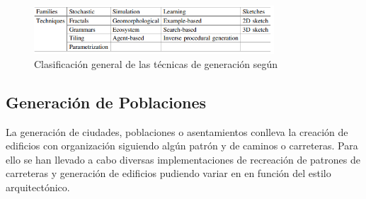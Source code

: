             \begin{figure}[h]
                \centering
                \includegraphics[width=0.8\textwidth]{img/terrain-generation-techniques.png}
                \caption{Clasificación general de las técnicas de generación según \cite{Valencia-Rosado2019}}
            \end{figure}
        




    \subsection{Generación de Poblaciones}

        La generación de ciudades, poblaciones o asentamientos conlleva la creación de edificios con organización siguiendo algún patrón y de caminos o carreteras. Para ello se han llevado a cabo diversas implementaciones de recreación de patrones de carreteras y generación de edificios pudiendo variar en en función del estilo arquitectónico. 


